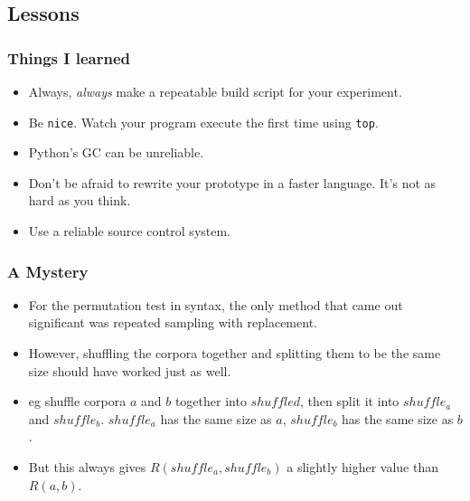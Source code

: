\documentclass{beamer}
\begin{document}

\subsection{Lessons}
\begin{frame}
  \frametitle{Things I learned}
  \begin{itemize}
  \item Always, {\it always} make a repeatable build script for your experiment.
  \item Be {\tt nice}. Watch your program execute the first time using
    {\tt top}.
  \item Python's GC can be unreliable.
  \item Don't be afraid to rewrite your prototype in a faster
    language. It's not as hard as you think.
  \item Use a reliable source control system.
  \end{itemize}
\end{frame}
\begin{frame}
  \frametitle{A Mystery}
  \begin{itemize}
  \item For the permutation test in syntax, the only method that came
    out significant was repeated sampling with replacement.
  \item However, shuffling the corpora together and splitting them to
    be the same size should have worked just as well.
  \item eg shuffle corpora $a$ and $b$ together into $shuffled$, then
    split it into $shuffle_a$ and $shuffle_b$. $shuffle_a$ has the
    same size as $a$, $shuffle_b$ has the same size as $b$.
  \item But this always gives $R(shuffle_a,shuffle_b)$ a slightly
    higher value than $R(a,b)$.
  \end{itemize}
\end{frame}
\end{document}
